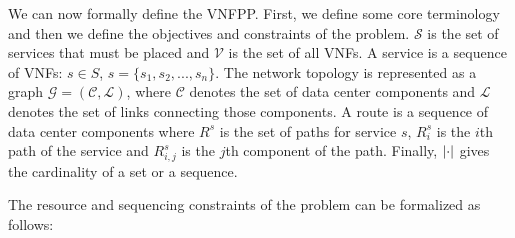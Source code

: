






We can now formally define the VNFPP. First, we define some core terminology and then we define the objectives and constraints of the problem. $\mathcal{S}$ is the set of services that must be placed and $\mathcal{V}$ is the set of all VNFs. A service is a sequence of VNFs: $s \in S$, $s = \{s_1, s_2, ..., s_n\}$. The network topology is represented as a graph $\mathcal{G}=(\mathcal{C},\mathcal{L})$, where $\mathcal{C}$ denotes the set of data center components and $\mathcal{L}$ denotes the set of links connecting those components. A route is a sequence of data center components where $R^s$ is the set of paths for service $s$, $R_{i}^s$ is the $i$th path of the service and $R_{i,j}^s$ is the $j$th component of the path. Finally, $\left\lvert \cdot \right\rvert$ gives the cardinality of a set or a sequence. 

The resource and sequencing constraints of the problem can be formalized as follows:


